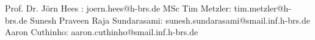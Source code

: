 

    {
        \begin{minipage}{1\linewidth}
            Prof. Dr. Jörn Hees : joern.hees@h-brs.de\newline
            MSc Tim Metzler: tim.metzler@h-brs.de\newline
            Sunesh Praveen Raja Sundarasami: sunesh.sundarasami@smail.inf.h-brs.de\newline
            Aaron Cuthinho: aaron.cuthinho@smail.inf.h-brs.de\newline
        \end{minipage}

    }

